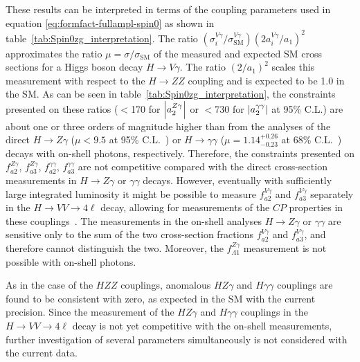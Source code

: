 These results can be interpreted in terms of the coupling parameters
used in equation \eqref{eq:formfact-fullampl-spin0} as shown in table~\ref{tab:Spin0zg_interpretation}.
The ratio $(\sigma^{V\gamma}_i/\sigma^{V\gamma}_\mathrm{SM})(2a_i^{V\gamma}/{a_1})^2$ approximates the ratio
$\mu = \sigma / \sigma_\mathrm{SM}$ of the measured and expected SM cross sections for a Higgs boson decay $H\to V\gamma$.
The ratio $({2}/{a_1})^2$ scales this measurement with respect to the $H\to ZZ$ coupling and  is expected to be 1.0 in the SM.
As can be seen in table~\ref{tab:Spin0zg_interpretation}, the constraints presented on these ratios
($<$170 for $\abs{a_2^{Z\gamma}}$ or $<$730 for $\abs{a_2^{\gamma\gamma}}$ at 95\% C.L.)
are about one or three orders of magnitude higher than from the analyses of the direct
$H\to Z\gamma$ ($\mu < 9.5$ at 95\% C.L.~\cite{Chatrchyan:2013vaa}) or
$H\to\gamma\gamma$ ($\mu = 1.14^{+0.26}_{-0.23}$ at 68\% C.L.~\cite{Khachatryan:2014ira})
decays with on-shell photons, respectively.
Therefore, the constraints presented on $f_{a2}^{Z\gamma}$, $f_{a3}^{Z\gamma}$, $f_{a2}^{\gamma\gamma}$,
$f_{a3}^{\gamma\gamma}$ are not competitive compared with the direct cross-section measurements
in $H\to Z\gamma$ or $\gamma\gamma$ decays.
However, eventually with sufficiently large integrated luminosity it might be possible to measure
$f_{a2}^{V\gamma}$ and $f_{a3}^{V\gamma}$ separately in the $H\to VV\to 4\ell$ decay,
allowing for measurements of the $CP$ properties in these couplings~\cite{Dawson:2013bba,Chen:2014gka}.
The measurements in the on-shell analyses $H\to Z\gamma$ or $\gamma\gamma$ are sensitive only to the sum
of the two cross-section fractions $f_{a2}^{V\gamma}$ and $f_{a3}^{V\gamma}$, and therefore cannot distinguish the two.
Moreover, the $f_{\Lambda1}^{Z\gamma}$ measurement is not possible with on-shell photons.

As in the case of the $HZZ$ couplings, anomalous $HZ\gamma$ and $H\gamma\gamma$
couplings are found to be consistent with zero, as expected  in the SM with the current precision.
Since the measurement of the $HZ\gamma$ and $H\gamma\gamma$ couplings in the
$H\to VV\to 4\ell$ decay is not yet competitive with the on-shell measurements, further
investigation of several parameters simultaneously is not considered with the current data.